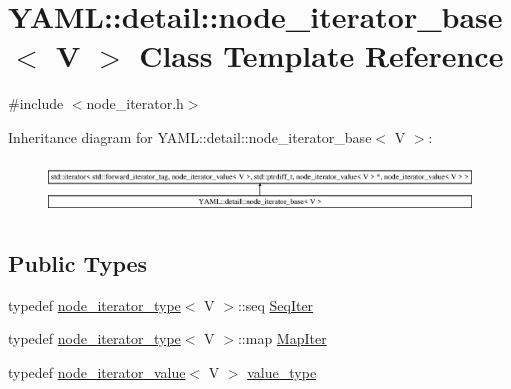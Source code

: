 \hypertarget{class_y_a_m_l_1_1detail_1_1node__iterator__base}{}\section{Y\+A\+ML\+::detail\+::node\+\_\+iterator\+\_\+base$<$ V $>$ Class Template Reference}
\label{class_y_a_m_l_1_1detail_1_1node__iterator__base}


{\ttfamily \#include $<$node\+\_\+iterator.\+h$>$}

Inheritance diagram for Y\+A\+ML\+::detail\+::node\+\_\+iterator\+\_\+base$<$ V $>$\+:\begin{figure}[H]
\begin{center}
\leavevmode
\includegraphics[height=1.410579cm]{class_y_a_m_l_1_1detail_1_1node__iterator__base}
\end{center}
\end{figure}
\subsection*{Public Types}
\begin{DoxyCompactItemize}
\item 
typedef \mbox{\hyperlink{struct_y_a_m_l_1_1detail_1_1node__iterator__type}{node\+\_\+iterator\+\_\+type}}$<$ V $>$\+::seq \mbox{\hyperlink{class_y_a_m_l_1_1detail_1_1node__iterator__base_a8f7819d74588685905ebe83938c2a89b}{Seq\+Iter}}
\item 
typedef \mbox{\hyperlink{struct_y_a_m_l_1_1detail_1_1node__iterator__type}{node\+\_\+iterator\+\_\+type}}$<$ V $>$\+::map \mbox{\hyperlink{class_y_a_m_l_1_1detail_1_1node__iterator__base_aaa2316d6fa0080ad766fc2429f7a68ed}{Map\+Iter}}
\item 
typedef \mbox{\hyperlink{struct_y_a_m_l_1_1detail_1_1node__iterator__value}{node\+\_\+iterator\+\_\+value}}$<$ V $>$ \mbox{\hyperlink{class_y_a_m_l_1_1detail_1_1node__iterator__base_ac091253ed737c52668c9f9d84bdfd777}{value\+\_\+type}}
\end{DoxyCompactItemize}
